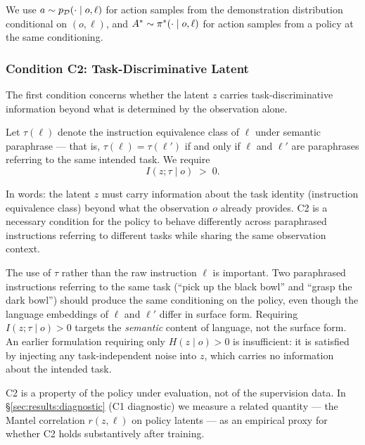 We use $a \sim p_{\mathcal{D}}(\cdot \mid o, \ell)$ for action samples from the demonstration
distribution conditional on $(o, \ell)$, and $A^{*} \sim \pi^{*}(\cdot \mid o, \ell)$ for
action samples from a policy at the same conditioning.

\subsubsection{Condition C2: Task-Discriminative Latent}
\label{sec:theory:c2}

The first condition concerns whether the latent $z$ carries task-discriminative
information beyond what is determined by the observation alone.

\begin{condition}
\label{cond:c2}
Let $\tau(\ell)$ denote the instruction equivalence class of $\ell$ under semantic
paraphrase --- that is, $\tau(\ell) = \tau(\ell')$ if and only if $\ell$ and $\ell'$ are
paraphrases referring to the same intended task. We require
\begin{equation}
I(z; \tau \mid o) \;>\; 0.
\label{eq:c2}
\end{equation}
\end{condition}

In words: the latent $z$ must carry information about the task identity (instruction
equivalence class) beyond what the observation $o$ already provides. C2 is a necessary
condition for the policy to behave differently across paraphrased instructions referring
to different tasks while sharing the same observation context.

The use of $\tau$ rather than the raw instruction $\ell$ is important. Two paraphrased
instructions referring to the same task (``pick up the black bowl'' and ``grasp the dark
bowl'') should produce the same conditioning on the policy, even though the language
embeddings of $\ell$ and $\ell'$ differ in surface form. Requiring $I(z; \tau \mid o) > 0$
targets the \emph{semantic} content of language, not the surface form. An earlier
formulation requiring only $H(z \mid o) > 0$ is insufficient: it is satisfied by injecting
any task-independent noise into $z$, which carries no information about the intended task.

C2 is a property of the policy under evaluation, not of the supervision data. In
\S\ref{sec:results:diagnostic} (C1 diagnostic) we measure a related quantity --- the Mantel
correlation $r(z, \ell)$ on policy latents --- as an empirical proxy for whether C2 holds
substantively after training.

